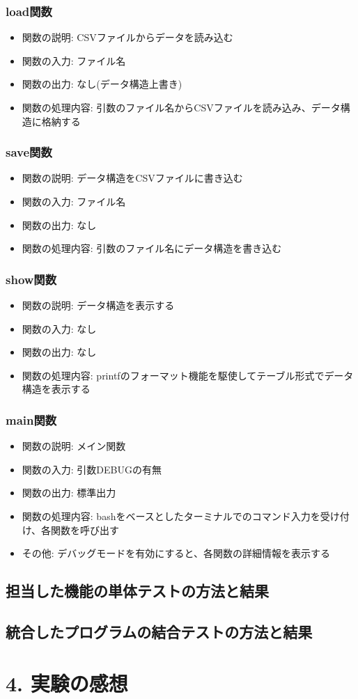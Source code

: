 \documentclass[a4paper,11pt]{jsarticle}
\begin{document}
\subsubsection*{load関数}
\begin{itemize}
    \item 関数の説明: CSVファイルからデータを読み込む
    \item 関数の入力: ファイル名
    \item 関数の出力: なし(データ構造上書き)
    \item 関数の処理内容: 引数のファイル名からCSVファイルを読み込み、データ構造に格納する
\end{itemize}

\subsubsection*{save関数}
\begin{itemize}
    \item 関数の説明: データ構造をCSVファイルに書き込む
    \item 関数の入力: ファイル名
    \item 関数の出力: なし
    \item 関数の処理内容: 引数のファイル名にデータ構造を書き込む
\end{itemize}

\subsubsection*{show関数}
\begin{itemize}
    \item 関数の説明: データ構造を表示する
    \item 関数の入力: なし
    \item 関数の出力: なし
    \item 関数の処理内容: printfのフォーマット機能を駆使してテーブル形式でデータ構造を表示する
\end{itemize}

\subsubsection*{main関数}
\begin{itemize}
    \item 関数の説明: メイン関数
    \item 関数の入力: 引数DEBUGの有無
    \item 関数の出力: 標準出力
    \item 関数の処理内容: bashをベースとしたターミナルでのコマンド入力を受け付け、各関数を呼び出す
    \item その他: デバッグモードを有効にすると、各関数の詳細情報を表示する
\end{itemize}

\subsection*{担当した機能の単体テストの方法と結果}

\subsection*{統合したプログラムの結合テストの方法と結果}

\section*{4. 実験の感想}
\end{document}
